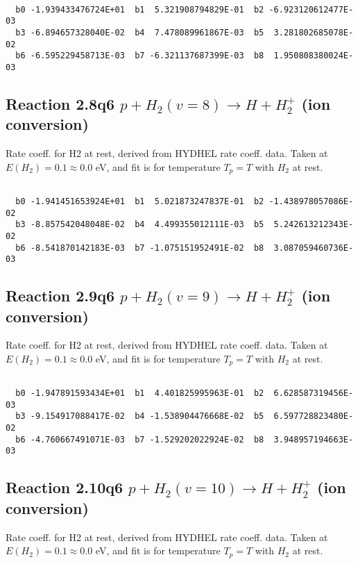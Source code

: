 \documentclass[12pt,dvipdfmx]{article}
\begin{document}
\begin{small}\begin{verbatim}

  b0 -1.939433476724E+01  b1  5.321908794829E-01  b2 -6.923120612477E-03
  b3 -6.894657328040E-02  b4  7.478089961867E-03  b5  3.281802685078E-02
  b6 -6.595229458713E-03  b7 -6.321137687399E-03  b8  1.950808380024E-03

\end{verbatim}\end{small}

\newpage
\subsection{
Reaction 2.8q6
$ p + H_2(v=8) \rightarrow H + H_2^+$ (ion conversion)
}
Rate coeff. for H2 at rest, derived from HYDHEL rate coeff. data.
Taken at $E(H_2) = 0.1 \approx 0.0$ eV,  and fit is for temperature $T_p=T$ with $H_2$ at rest.

\begin{small}\begin{verbatim}

  b0 -1.941451653924E+01  b1  5.021873247837E-01  b2 -1.438978057086E-02
  b3 -8.857542048048E-02  b4  4.499355012111E-03  b5  5.242613212343E-02
  b6 -8.541870142183E-03  b7 -1.075151952491E-02  b8  3.087059460736E-03

\end{verbatim}\end{small}

\newpage
\subsection{
Reaction 2.9q6
$ p + H_2(v=9) \rightarrow H + H_2^+$ (ion conversion)
}
Rate coeff. for H2 at rest, derived from HYDHEL rate coeff. data.
Taken at $E(H_2) = 0.1 \approx 0.0$ eV,  and fit is for temperature $T_p=T$ with $H_2$ at rest.

\begin{small}\begin{verbatim}

  b0 -1.947891593434E+01  b1  4.401825995963E-01  b2  6.628587319456E-03
  b3 -9.154917088417E-02  b4 -1.538904476668E-02  b5  6.597728823480E-02
  b6 -4.760667491071E-03  b7 -1.529202022924E-02  b8  3.948957194663E-03

\end{verbatim}\end{small}

\newpage
\subsection{
Reaction 2.10q6
$ p + H_2(v=10) \rightarrow H + H_2^+$ (ion conversion)
}
Rate coeff. for H2 at rest, derived from HYDHEL rate coeff. data.
Taken at $E(H_2) = 0.1 \approx 0.0$ eV,  and fit is for temperature $T_p=T$ with $H_2$ at rest.
\end{document}
